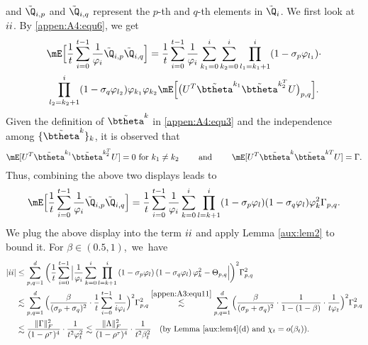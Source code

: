and $\tilde{\Q}_{i, p}$ and $\tilde{\Q}_{i, q}$ represent the $p$-th and $q$-th elements in $\tilde{\Q}_i$. We first look at $\uppercase\expandafter{\romannumeral2}$. By \eqref{appen:A4:equ6}, we get
\begin{multline*}
\mE\Big[\frac{1}{t} \sum_{i=0}^{t-1} \frac{1}{\varphi_i} \tilde{\Q}_{i, p}\tilde{\Q}_{i, q}\Big]= \frac{1}{t} \sum_{i=0}^{t-1} \frac{1}{\varphi_i} \sum_{k_1=0}^i \sum_{k_2=0}^i\prod_{l_1=k_1+1}^i(1-\sigma_p\varphi_{l_1}) \cdot\\
\prod_{l_2=k_2+1}^i(1-\sigma_q\varphi_{l_2}) \varphi_{k_1}\varphi_{k_2} \mE\Big[\big(U^T \tilde{\btheta}^{k_1}\tilde{\btheta}^{k_2^T} U\big)_{p,q}\Big].
\end{multline*}
Given the definition of $\tilde{\btheta}^k$ in \eqref{appen:A4:equ3} and the independence among $\{\tilde{\btheta}^k\}_k$, it is observed that
\begin{equation*}
\mE[U^T\tilde{\btheta}^{k_1} \tilde{\btheta}^{k_2^T}U] = 0\text{ for }k_1\neq k_2 \quad\quad \text{ and } \quad\quad \mE[U^T\tilde{\btheta}^{k}\tilde{\btheta}^{kT}U] = \Gamma.
\end{equation*}
Thus, combining the above two displays leads to 
\begin{equation*}
\mE\Big[\frac{1}{t} \sum_{i=0}^{t-1} \frac{1}{\varphi_i} \tilde{\Q}_{i, p}\tilde{\Q}_{i, q}\Big]= \frac{1}{t} \sum_{i=0}^{t-1}\frac{1}{\varphi_i}\sum_{k=0}^i\prod_{l=k+1}^i (1-\sigma_p\varphi_l)(1-\sigma_q\varphi_l)\varphi_k^2\Gamma_{p,q}.
\end{equation*}
We plug the above display into the term $\uppercase\expandafter{\romannumeral2}$ and apply Lemma \ref{aux:lem2} to bound it. For \mbox{$\beta\in(0.5,1)$},~we~have
\begin{align}\label{appen:A4:equ8}
|\uppercase\expandafter{\romannumeral2}| &\leq  \sum_{p,q=1}^d\bigg(\frac{1}{t} \sum_{i=0}^{t-1} \Big|\frac{1}{\varphi_i} \sum_{k=0}^i \prod_{l=k+1 }^i\left(1-\sigma_p\varphi_l\right)\left(1-\sigma_q\varphi_l\right) \varphi_k^2-\Theta_{p, q}\Big|\bigg)^2\Gamma_{p,q}^2\nonumber\\
&\lesssim \sum_{p,q=1}^d\Big(\frac{\beta}{(\sigma_p+\sigma_q)^2}\cdot \frac{1}{t}\sum_{i=0}^{t-1}\frac{1}{i\varphi_i}\Big)^2\Gamma_{p,q}^2 \stackrel{\eqref{appen:A3:equ11}}{\lesssim} \sum_{p,q=1}^d\Big(\frac{\beta}{(\sigma_p+\sigma_q)^2}\cdot \frac{1}{1-(1-\beta)}\cdot \frac{1}{t\varphi_t}\Big)^2\Gamma_{p,q}^2\nonumber\\
&\lesssim \frac{\|\Gamma\|_F^2}{(1-\rho^\tau)^4} \cdot\frac{1}{t^2\varphi_t^2}\lesssim \frac{\|\Lambda\|_F^2}{(1-\rho^\tau)^4} \cdot\frac{1}{t^2\beta_t^2}\quad (\text{by Lemma \ref{aux:lem4}(d) and }\chi_t=o(\beta_t)).
\end{align}
